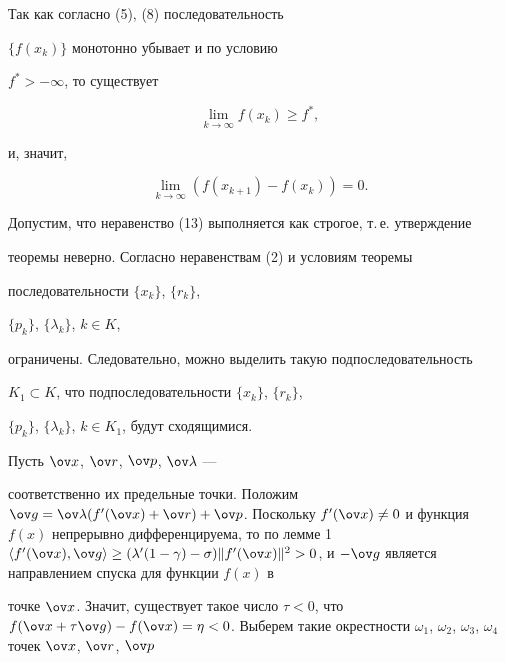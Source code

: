 \begin{pf}


Так как согласно (5), (8) последовательность


$\{{f(x_k)} \}$ монотонно убывает и по условию


$f^*>-\infty$, то существует


\begin{equation}


\lim_{k \to \infty}f(x_k)\ge f^*,


\end{equation}


и, значит,


\begin{equation}


\lim_{k \to \infty}(f(x_{k+1})-f(x_k))=0.


\end{equation}


Допустим, что неравенство (13) выполняется как строгое, т.\,е. утверждение


теоремы неверно. Согласно неравенствам (2) и условиям теоремы


последовательности $\{{x_k} \}$, $\{{r_k} \}$,


$\{{p_k} \}$, $\{{\lambda_k} \}$, $k\in K$,


ограничены. Следовательно, можно выделить такую подпоследовательность


$K_1\subset K$, что подпоследовательности $\{{x_k} \}$, $\{{r_k} \}$,


$\{{p_k} \}$, $\{{\lambda_k} \}$, $k\in K_1$, будут сходящимися.


Пусть $\ov x$, $\ov r$, $\ov p$, $\ov \lambda$ ---


соответственно их предельные точки. Положим $\ov g=\ov \lambda


({f}'(\ov x)+\ov r)+\ov p$. Поскольку ${f}'(\ov x)\neq 0$ и функция $f


(x)$ непрерывно дифференцируема, то по лемме 1 $\langle {{f}'(\ov x),\ov


g} \rangle \ge ({\lambda}' (1-\gamma)-\sigma) \|{{f}'(\ov x)}


\|^2>0$, и $-\ov g$ является направлением спуска для функции $f(x)$ в


точке $\ov x$. Значит, существует такое число $\tau <0$, что $f(\ov


x+\tau \ov g)-f(\ov x)=\eta <0$. Выберем такие окрестности $\omega


_1$, $\omega_ 2$, $\omega_3$, $\omega_4$ точек $\ov x$, $\ov r$, $\ov p$



\end{pf}
